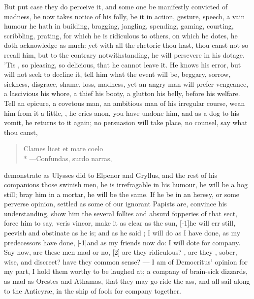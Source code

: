 {But put case they do perceive it, and some one be manifestly convicted
of madness, he now takes notice of his folly, be it in action,
gesture, speech, a vain humour he hath in building, bragging, jangling,
spending, gaming, courting, scribbling, prating, for which he is
ridiculous to others, on which he dotes, he doth acknowledge as
much: yet with all the rhetoric thou hast, thou canst not so recall
him, but to the contrary notwithstanding, he will persevere in his
dotage. 'Tis , so
pleasing, so delicious, that he cannot leave it. He knows his
error, but will not seek to decline it, tell him what the event will
be, beggary, sorrow, sickness, disgrace, shame, loss, madness, yet
an angry man will prefer vengeance, a lascivious his whore, a
thief his booty, a glutton his belly, before his welfare. Tell an
epicure, a covetous man, an ambitious man of his irregular course, wean
him from it a little, , he cries anon, you have
undone him, and as a dog to his vomit, he returns to it again; no
persuasion will take place, no counsel, say what thou canst,

\begin{verse}
\textlatin{Clames licet et mare coelo}\\*
---\textlatin{Confundas, surdo narras,}
\end{verse}

demonstrate as Ulysses did to Elpenor and Gryllus, and the rest of
his companions those swinish men, he is irrefragable in his humour, he
will be a hog still; bray him in a mortar, he will be the same. If he
be in an heresy, or some perverse opinion, settled as some of our
ignorant Papists are, convince his understanding, show him the several
follies and absurd fopperies of that sect, force him to say, veris
vincor, make it as clear as the sun, [-1\baselineskip]he will err still, peevish
and obstinate as he is; and as he said ; I will do as I have done, as
my predecessors have done, [-1\baselineskip]and as my friends now do: I will dote
for company. Say now, are these men mad or no, [2\baselineskip] are they ridiculous? , are they , sober, wise, and discreet? have they common sense? --- I am of Democritus' opinion for my part, I hold
them worthy to be laughed at; a company of brain-sick dizzards, as mad
as Orestes and Athamas, that they may go ride the ass, and all
sail along to the Anticyr\ae{}, in the ship of fools for company together.

}
